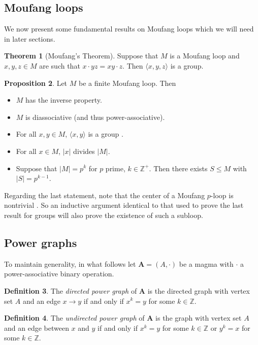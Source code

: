\documentclass[12pt, twoside, openright]{report}
\theoremstyle{definition}
\newtheorem{thm}{Theorem}[chapter]
\newtheorem{prp}[thm]{Proposition}
\newtheorem{dfn}[thm]{Definition}
\newcommand{\ZZZ}{\mathbb{Z}}
\begin{document}
\subsection{Moufang loops}

We now present some fundamental results on Moufang loops which we will need in later sections.

\begin{thm}[Moufang's Theorem]
  Suppose that $M$ is a Moufang loop and $x, y, z\in M$ are such that $x\cdot yz = xy\cdot z$.
    Then $\langle x, y, z\rangle$ is a group.
\end{thm}

\begin{prp}\label{gen-facts}
	Let $M$ be a finite Moufang loop. Then
    \begin{itemize}
        \item $M$ has the inverse property.
        \item $M$ is diassociative (and thus power-associative).
        \item For all $x, y\in M$, $\langle x, y\rangle$ is a group \cite{Moufang}.
  	    \item For all $x\in M$, $|x|$ divides $|M|$.
        \item Suppose that $|M| = p^k$ for $p$ prime, $k\in\ZZZ^+$. Then there exists $S\leq M$ with $|S| = p^{k - 1}$.
    \end{itemize}
\end{prp}

Regarding the last statement, note that the center of a Moufang $p$-loop is nontrivial \cite{2-loops} \cite{Glau}.
  So an inductive argument identical to that used to prove the last result for groups will also prove the existence
  of such a subloop.

\subsection{Power graphs}

To maintain generality, in what follows let $\textbf{A} = (A, \cdot)$ be a magma with $\cdot$ a power-associative
  binary operation.

\begin{dfn}
	The \textit{directed power graph} of \textbf{A} is the directed graph with vertex set $A$ and an edge $x\to y$
    if and only if $x^k = y$ for some $k\in\mathbb{Z}$.
\end{dfn}

\begin{dfn}
	The \textit{undirected power graph} of \textbf{A} is the graph with vertex set $A$ and an edge between $x$
    and $y$ if and only if $x^k = y$ for some $k\in \mathbb{Z}$ or $y^k = x$ for some $k\in\mathbb{Z}$.
\end{dfn}
\end{document}
